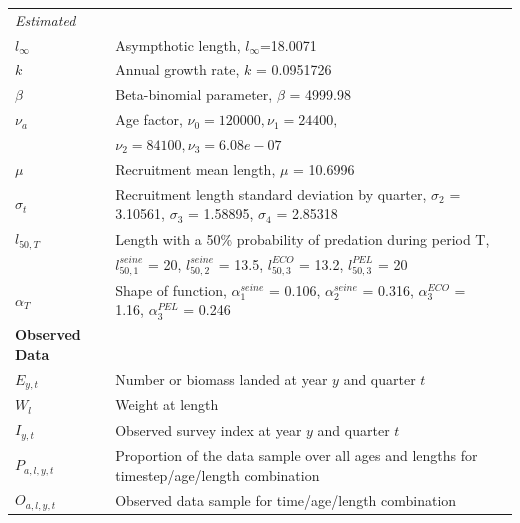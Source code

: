 \documentclass[review]{elsarticle}
\begin{document}
\begin{table}[h]
\begin{tabular}{|l|l l|}
\textit{Estimated} \\

$l_\infty$  &   Asympthotic length, $l_\infty$=18.0071  \\

\it $k$       &   Annual growth rate, $k$ = 0.0951726    \\

$\beta$ & Beta-binomial parameter, $\beta$ = 4999.98 \\

$\nu_{a}$ & Age factor, $\nu_{0} = 120000, \nu_{1} = 24400,$\\
& $\nu_{2} = 84100, \nu_{3} = 6.08e-07$ \\

$\mu$ & Recruitment mean length, $\mu$ = 10.6996 \\

$\sigma_t$ & Recruitment length standard deviation by quarter, $\sigma_2$ = 3.10561,  $\sigma_3$ = 1.58895, $\sigma_4$ = 2.85318 \\

$l_{50,T}$ & Length with a 50\% probability of predation during period T,\\
& $l_{50,1}^{seine}$ = 20, $l_{50,2}^{seine}$ = 13.5, $l_{50,3}^{ECO}$ = 13.2,  $l_{50,3}^{PEL}$ = 20 \\

$\alpha_{T}$ & Shape of function, $\alpha_{1}^{seine}$ = 0.106, $\alpha_{2}^{seine}$ = 0.316, $\alpha_{3}^{ECO}$ = 1.16,    $\alpha_{3}^{PEL}$ = 0.246\\

\textbf{Observed Data}        \\

\it $E_{y,t}$   & Number or biomass landed at year $y$ and quarter $t$ \\


$W_{l}$   &     Weight at length \\

$I_{y,t}$  &  Observed survey index at year $y$ and quarter $t$ \\

$P_{a,l,y,t}$  &    Proportion of the data sample over all ages and lengths for timestep/age/length combination      \\

$O_{a,l,y,t}$ & Observed data sample for time/age/length combination \\


\end{tabular}
\end{table}
\end{document}
